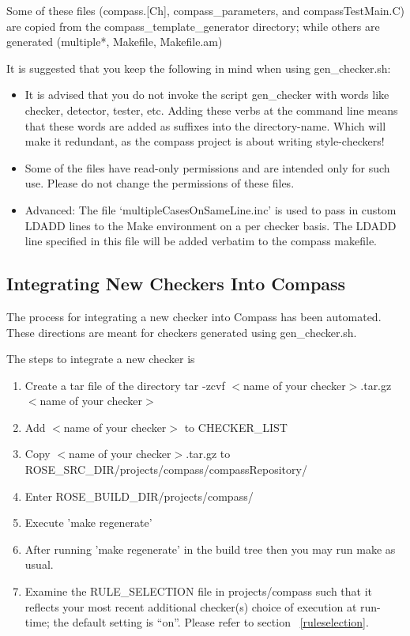 Some of these files (compass.[Ch], compass\_parameters, and compassTestMain.C)
are copied from the compass\_template\_generator directory; while others are
generated (multiple*, Makefile, Makefile.am)

It is suggested that you keep the following in mind when using gen\_checker.sh:
\begin{itemize}
\item
   It is advised that you do not invoke the script gen\_checker with words
   like checker, detector, tester, etc. Adding these verbs at the command
   line means that these words are added as suffixes into the
   directory-name. Which will make it redundant, as the compass project is
   about writing style-checkers!
\item
   Some of the files have read-only permissions and are intended only for
   such use. Please do not change the permissions of these files.
\item
Advanced: The file `multipleCasesOnSameLine.inc' is used to pass in custom LDADD lines
to the Make environment on a per checker basis. The LDADD line specified in
this file will be added verbatim to the compass makefile.

\end{itemize}

\subsection{Integrating New Checkers Into Compass}
\label{howToIntegrateNewCheckers}

The process for integrating a new checker into Compass has been automated. These directions
are meant for checkers generated using gen\_checker.sh.

The steps to integrate a new checker is
\begin{enumerate}
   \item Create a tar file of the directory tar -zcvf  $<$name of your checker$>$.tar.gz $<$name of your checker$>$
   \item Add $<$name of your checker$>$ to CHECKER\_LIST
   \item Copy $<$name of your checker$>$.tar.gz to ROSE\_SRC\_DIR/projects/compass/compassRepository/
   \item Enter ROSE\_BUILD\_DIR/projects/compass/ 
   \item Execute 'make regenerate'
   \item After running 'make regenerate' in the build tree then you may run make as usual.
   \item %
	Examine the RULE\_SELECTION file in projects/compass such that it 
	reflects your most recent additional checker(s) choice of execution at
	run-time; the default setting is ``on''. Please refer to section 
	~\ref{ruleselection}.
\end{enumerate}

